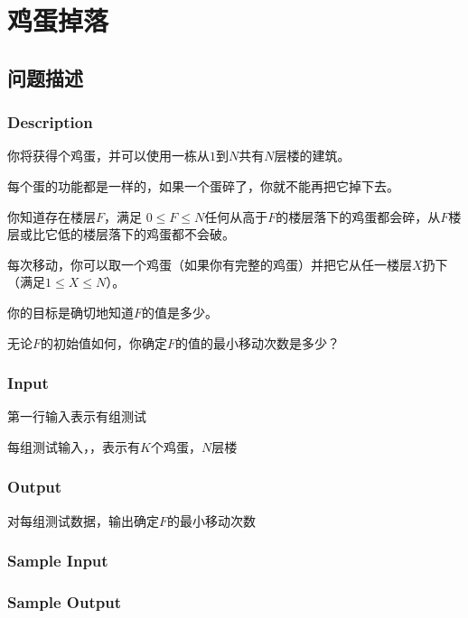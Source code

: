 \section{鸡蛋掉落}
\subsection{问题描述}
\subsubsection*{Description}
你将获得个鸡蛋，并可以使用一栋从$1$到$N$共有$N$层楼的建筑。

每个蛋的功能都是一样的，如果一个蛋碎了，你就不能再把它掉下去。

你知道存在楼层$F$，满足 $0\leq F\leq N$任何从高于$F$的楼层落下的鸡蛋都会碎，从$F$楼层或比它低的楼层落下的鸡蛋都不会破。

每次移动，你可以取一个鸡蛋（如果你有完整的鸡蛋）并把它从任一楼层$X$扔下（满足$1\leq X\leq N$）。

你的目标是确切地知道$F$的值是多少。

无论$F$的初始值如何，你确定$F$的值的最小移动次数是多少？

\subsubsection*{Input}

第一行输入表示有组测试

每组测试输入，，表示有$K$个鸡蛋，$N$层楼

\subsubsection*{Output}

对每组测试数据，输出确定$F$的最小移动次数

\subsubsection*{Sample Input}





\subsubsection*{Sample Output}

